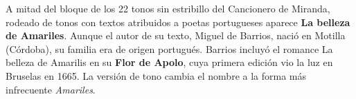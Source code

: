 A mitad del bloque de los 22 tonos sin estribillo del Cancionero de Miranda, rodeado de tonos con textos atribuidos a poetas portugueses aparece \textbf{La belleza de Amariles}. Aunque el autor de su texto, Miguel de Barrios, nació en Motilla (Córdoba), su familia era de origen portugués. Barrios incluyó el romance La belleza de Amarilis en su \textbf{Flor de Apolo}, cuya primera edición vio la luz en Bruselas en 1665. La versión de tono cambia el nombre a la forma más infrecuente \textit{Amariles}.
